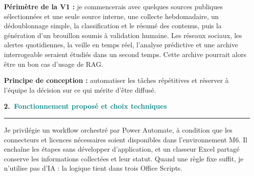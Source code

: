 \documentclass[10pt,a4paper]{article}
\newcommand{\partie}[2]{%
  {\Large\bfseries #1.\ \textcolor{teal}{#2}}\par\vspace{3pt}
  {\color{black!20}\rule{\linewidth}{0.4pt}}\par\vspace{4pt}}
\newcommand{\cadre}[1]{\textbf{\color{ardoise}#1 :}}
\newcommand{\solution}[1]{\textbf{\color{teal}#1 :}}
\begin{document}
\cadre{Périmètre de la V1} je commencerais avec quelques sources publiques sélectionnées et une seule source interne, une collecte hebdomadaire, un dédoublonnage simple, la classification et le résumé des contenus, puis la génération d’un brouillon soumis à validation humaine. Les réseaux sociaux, les alertes quotidiennes, la veille en temps réel, l’analyse prédictive et une archive interrogeable seraient étudiés dans un second temps. Cette archive pourrait alors être un bon cas d’usage de RAG.

\solution{Principe de conception} automatiser les tâches répétitives et réserver à l’équipe la décision sur ce qui mérite d’être diffusé.

\newpage
\partie{2}{Fonctionnement proposé et choix techniques}

Je privilégie un workflow orchestré par Power Automate, à condition que les connecteurs et licences nécessaires soient disponibles dans l’environnement M6. Il enchaîne les étapes sans développer d’application, et un classeur Excel partagé conserve les informations collectées et leur statut. Quand une règle fixe suffit, je n’utilise pas d’IA : la logique tient dans trois Office Scripts.
\end{document}
